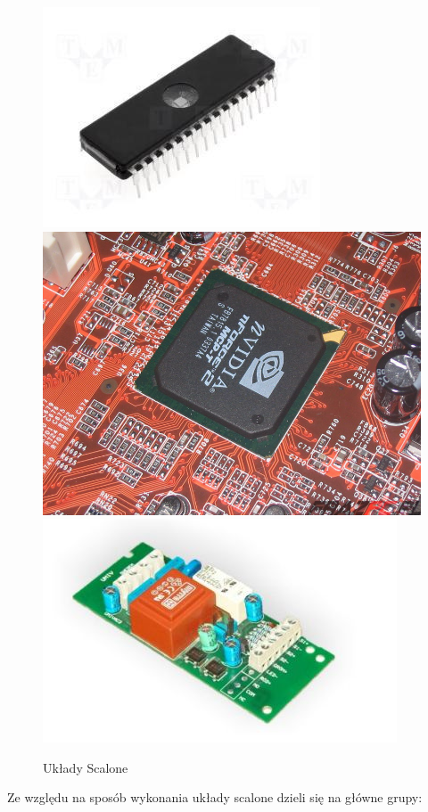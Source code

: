 \documentclass[a4paper,11pt]{article}
\begin{document}
\begin{figure}[!htb]
\centerline{\includegraphics[scale=0.4]{uklad1}
 			\includegraphics[scale=0.4]{uklad2}
 			\includegraphics[scale=0.4]{uklad3}}
\caption{Układy Scalone}
\label{fig:ukladyScalone}
\end{figure}

Ze względu na sposób wykonania układy scalone dzieli się na główne grupy:
\end{document}
